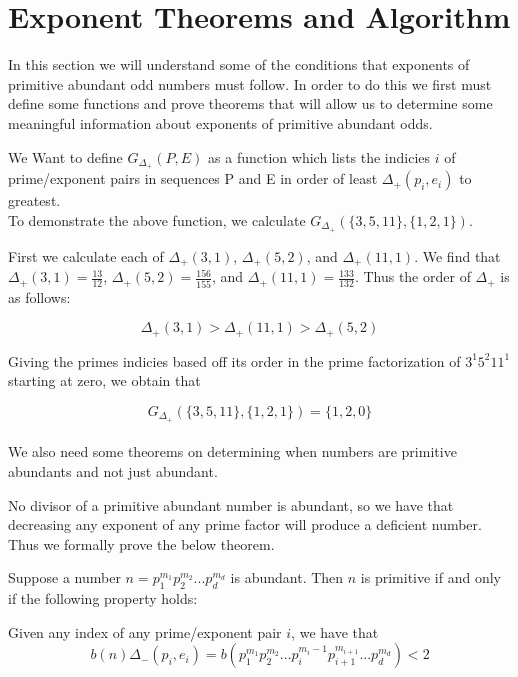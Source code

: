 \documentclass[../paper.tex]{subfiles}
\begin{document}
\section{Exponent Theorems and Algorithm}

In this section we will understand some of the conditions that
exponents of primitive abundant odd numbers must follow. In order
to do this we first must define some functions and prove theorems 
that will allow us to determine some meaningful information about
exponents of primitive abundant odds.

We Want to define $G_{\Delta_{+}}(P,E)$ as a function which lists
the indicies $i$ of prime/exponent pairs in sequences P and E
in order of least $\Delta_{+}(p_i, e_i)$ to greatest.
\\

To demonstrate the above function, we calculate 
$G_{\Delta_{+}}(\{3,5,11\}, \{1,2,1\})$.

First we calculate each of $\Delta_{+}(3,1)$, $\Delta_{+}(5,2)$, 
and $\Delta_{+}(11,1)$. We find that 
$\Delta_{+}(3,1) = \frac{13}{12}$,
$\Delta_{+}(5,2) = \frac{156}{155}$, and
$\Delta_{+}(11,1)= \frac{133}{132}$.
Thus the order of $\Delta_{+}$ is as follows:

$$ \Delta_{+}(3,1) > \Delta_{+}(11,1) > \Delta_{+}(5,2)$$

Giving the primes indicies based off its order in the prime
factorization of $3^1 5^2 11^1$ starting at zero, we obtain that

$$G_{\Delta_{+}}(\{3,5,11\}, \{1,2,1\}) = \{1,2,0\}$$
\\

We also need some theorems on determining when numbers are 
primitive abundants and not just abundant.

No divisor of a primitive abundant number is abundant, so 
we have that decreasing any exponent of any prime factor will
produce a deficient number. Thus we formally prove the below
theorem.

\begin{theorem}\label{del_minus_thm}
Suppose a number $n = p_1^{m_1} p_2^{m_2} ... p_d^{m_d}$ is 
abundant. Then $n$ is primitive if and only if the 
following property holds:

Given any index of any prime/exponent pair $i$, we have that
$$b(n) \Delta_{-}(p_i, e_i) = b(p_1^{m_1} p_2^{m_2} ...  
p_i^{m_i - 1} p_{i+1}^{m_{i+1}}... p_d^{m_d}) < 2$$
\end{theorem}
\end{document}
